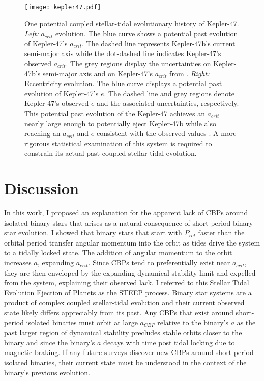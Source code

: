 \begin{figure}
	\texttt{[image: kepler47.pdf]}
    \caption{One potential coupled stellar-tidal evolutionary history of Kepler-47. {\it Left:}  $a_{crit}$ evolution.  The blue curve shows a potential past evolution of Kepler-47's $a_{crit}$.  The dashed line represents Kepler-47b's current semi-major axis while the dot-dashed line indicates Kepler-47's observed $a_{crit}$.  The grey regions display the uncertainties on Kepler-47b's semi-major axis and on Kepler-47's $a_{crit}$ from \citet{Orosz2012}. {\it Right:} Eccentricity evolution.  The blue curve displays a potential past evolution of Kepler-47's $e$.  The dashed line and grey regions denote Kepler-47's observed $e$ and the associated uncertainties, respectively.  This potential past evolution of the Kepler-47 achieves an $a_{crit}$ nearly large enough to potentially eject Kepler-47b while also reaching an $a_{crit}$ and $e$ consistent with the observed values \citep{Orosz2012}.  A more rigorous statistical examination of this system is required to constrain its actual past coupled stellar-tidal evolution.}
    \label{STEEP:fig:kepler47}
\end{figure}


\section{Discussion} \label{STEEP:sec:discussion}

In this work, I proposed an explanation for the apparent lack of CBPs around isolated binary stars that arises as a natural consequence of short-period binary star evolution.  I showed that binary stars that start with $P_{rot}$ faster than the orbital period transfer angular momentum into the orbit as tides drive the system to a tidally locked state.  The addition of angular momentum to the orbit increases $a$, expanding $a_{crit}$.  Since CBPs tend to preferentially exist near $a_{crit}$, they are then enveloped by the expanding dynamical stability limit and expelled from the system, explaining their observed lack.  I referred to this Stellar Tidal Evolution Ejection of Planets as the STEEP process.  Binary star systems are a product of complex coupled stellar-tidal evolution and their current observed state likely differs appreciably from its past.  Any CBPs that exist around short-period isolated binaries must orbit at large $a_{CBP}$ relative to the binary's $a$ as the past larger region of dynamical stability precludes stable orbits closer to the binary and since the binary's $a$ decays with time post tidal locking due to magnetic braking.  If any future surveys discover new CBPs around short-period isolated binaries, their current state must be understood in the context of the binary's previous evolution.

